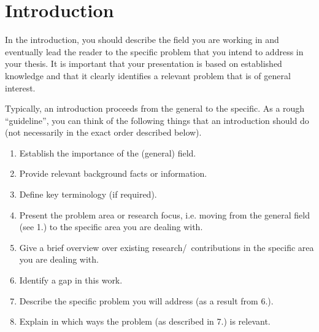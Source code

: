 \documentclass[12pt,a4paper,twoside]{article}
\begin{document}


\section{Introduction}
\label{sec:intro}
In the introduction, you should describe the field you are working in and eventually lead the reader to the specific problem that you intend to address in your thesis. It is important that your presentation is based on established knowledge and that it clearly identifies a relevant problem that is of general interest.

Typically, an introduction proceeds from the general to the specific. As a rough ``guideline'', you can think of the following things that an introduction should do (not necessarily in the exact order described below).
\begin{enumerate}
    \item Establish the importance of the (general) field.
    \item Provide relevant background facts or information.
    \item Define key terminology (if required).
    \item Present the problem area or research focus, i.e. moving from the general field (see 1.) to the specific area you are dealing with.
    \item Give a brief overview over existing research/~contributions in the specific area you are dealing with.
    \item Identify a gap in this work.
    \item Describe the specific problem you will address (as a result from 6.).
    \item Explain in which ways the problem (as described in 7.) is relevant.
\end{enumerate}
\end{document}
